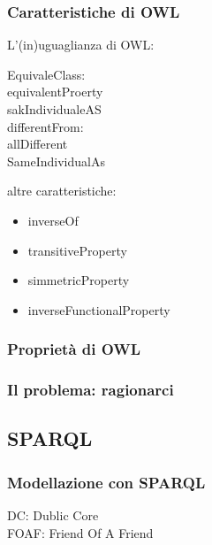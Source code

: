 			\subsubsection{Caratteristiche di OWL}
			
				L'(in)uguaglianza di OWL:	
					\begin{description}
						\item[EquivaleClass:]
						\item[equivalentProerty]
						\item[sakIndividualeAS]
						\item[differentFrom:]
						\item[allDifferent]
						\item[SameIndividualAs]
					\end{description}
					
				altre caratteristiche:
				
					\begin{itemize}
						\item inverseOf
						\item transitiveProperty
						\item simmetricProperty
						\item inverseFunctionalProperty
					\end{itemize}
					
			\subsubsection{Proprietà di OWL}
				
			\subsubsection{Il problema: ragionarci}
			
			
		\subsection{SPARQL}
		
			\subsubsection{Modellazione con SPARQL}		
		
			\begin{description}
				\item[DC: Dublic Core]
				\item[FOAF: Friend Of A Friend]
			\end{description}		
		
